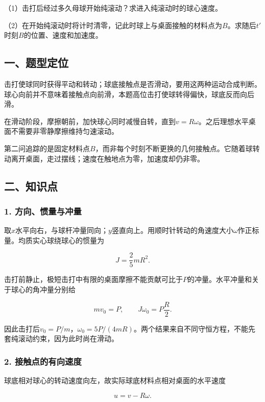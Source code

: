\documentclass[12pt,a4paper,fontset=fandol]{ctexart}
\begin{document}
（1）击打后经过多久母球开始纯滚动？求进入纯滚动时的球心速度。

（2）在开始纯滚动时将计时清零，记此时球上与桌面接触的材料点为\(B\)。求随后\(t'\)时刻\(B\)的位置、速度和加速度。

\subsection{一、题型定位}\label{ux4e00ux9898ux578bux5b9aux4f4d-1}

击打使球同时获得平动和转动；球底接触点是否滑动，要用这两种运动合成判断。球心向前并不意味着接触点向前滑，本题高位击打使球转得偏快，球底反而向后滑。

在滑动阶段，摩擦朝前，加快球心同时减慢自转，直到\(v=R\omega\)。之后理想水平桌面不需要非零静摩擦维持匀速滚动。

第二问追踪的是固定材料点\(B\)，而非每个时刻不断更换的几何接触点。它随着球转动离开桌面，走过摆线；速度在触地点为零，加速度却仍非零。

\subsection{二、知识点}\label{ux4e8cux77e5ux8bc6ux70b9-1}

\subsubsection{1.
方向、惯量与冲量}\label{ux65b9ux5411ux60efux91cfux4e0eux51b2ux91cf}

取\(x\)水平向右，与球杆冲量同向；\(y\)竖直向上。用顺时针转动的角速度大小\(\omega\)作正标量。均质实心球绕球心的惯量为

\[
J=\frac25mR^2.
\]

击打前静止，极短击打中有限的桌面摩擦不能贡献可比于\(P\)的冲量。水平冲量和关于球心的角冲量分别给

\[
mv_0=P,\qquad J\omega_0=P\frac R2.
\]

因此击打后\(v_0=P/m\)，\(\omega_0=5P/(4mR)\)。两个结果来自不同守恒方程，不能先套纯滚动约束，因为此时尚在滑动。

\subsubsection{2.
接触点的有向速度}\label{ux63a5ux89e6ux70b9ux7684ux6709ux5411ux901fux5ea6}

球底相对球心的转动速度向左，故实际球底材料点相对桌面的水平速度

\[
u=v-R\omega.
\]
\end{document}

